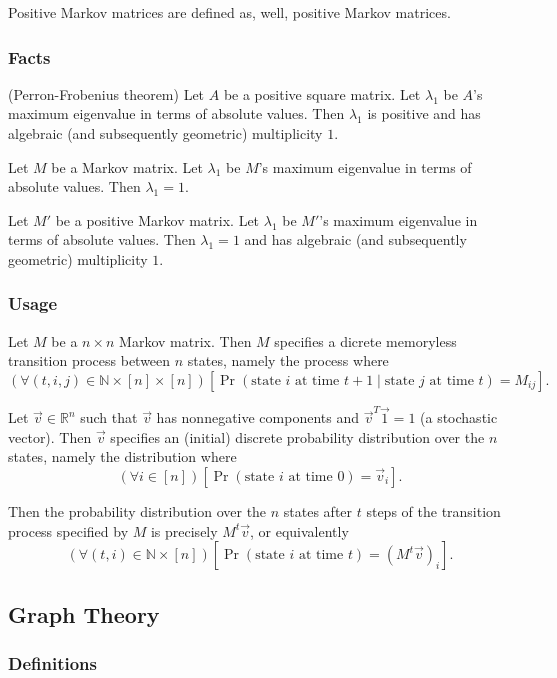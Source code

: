 \documentclass[12pt, titlepage, twoside]{amsart}
\newcommand{\R}{\ensuremath{\mathbb R}}
\newcommand{\N}{\ensuremath{\mathbb N}}
\begin{document}
Positive Markov matrices are defined as, well, positive Markov matrices.

\subsubsection{Facts}

(Perron-Frobenius theorem)
Let $A$ be a positive square matrix.
Let $\lambda_1$ be $A$'s maximum eigenvalue in terms of absolute values.
Then $\lambda_1$ is positive and has algebraic (and subsequently geometric) multiplicity $1$.~\cite{perron}

Let $M$ be a Markov matrix.
Let $\lambda_1$ be $M$'s maximum eigenvalue in terms of absolute values.
Then $\lambda_1 = 1$.~\cite{strang}

Let $M'$ be a positive Markov matrix.
Let $\lambda_1$ be $M'$'s maximum eigenvalue in terms of absolute values.
Then $\lambda_1 = 1$ and has algebraic (and subsequently geometric) multiplicity $1$.

\subsubsection{Usage}

Let $M$ be a $n\times n$ Markov matrix.
Then $M$ specifies a dicrete memoryless transition process between $n$ states, namely the process where
\[
  \left(\forall (t, i, j)\in\N\times[n]\times[n]\right)
  \left[\Pr(\text{state }i\text{ at time }t + 1\mid \text{state }j\text{ at time }t) = M_{ij}\right].
\]

Let $\vec{v}\in\R^n$ such that $\vec{v}$ has nonnegative components and $\vec{v}^T\vec{1} = 1$ (a stochastic vector).
Then $\vec{v}$ specifies an (initial) discrete probability distribution over the $n$ states, namely the distribution where
\[
  (\forall i\in[n])
  [\Pr(\text{state }i\text{ at time }0) = \vec{v}_i].
\]

Then the probability distribution over the $n$ states after $t$ steps of the transition process specified by $M$ is precisely $M^t\vec{v}$,
or equivalently
\[
  (\forall (t, i)\in\N\times[n])
  \left[\Pr(\text{state }i\text{ at time }t) = \left(M^t\vec{v}\right)_i\right].
\]

\subsection{Graph Theory}

\subsubsection{Definitions}
\end{document}
